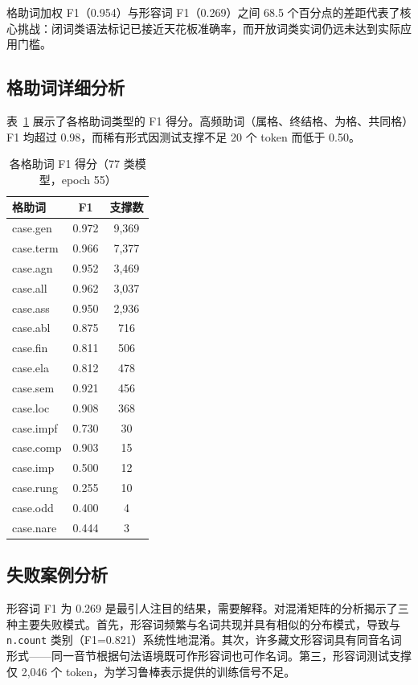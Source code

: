 \documentclass[11pt,a4paper]{article}
\begin{document}
格助词加权 F1（0.954）与形容词 F1（0.269）之间 68.5 个百分点的差距代表了核心挑战：闭词类语法标记已接近天花板准确率，而开放词类实词仍远未达到实际应用门槛。

\subsection{格助词详细分析}

表~\ref{tab:caseparticles} 展示了各格助词类型的 F1 得分。高频助词（属格、终结格、为格、共同格）F1 均超过 0.98，而稀有形式因测试支撑不足 20 个 token 而低于 0.50。

\begin{table}[h]
\centering
\caption{各格助词 F1 得分（77 类模型，epoch 55）}
\label{tab:caseparticles}
\begin{tabular}{lcc}
\toprule
格助词 & F1    & 支撑数 \\
\midrule
case.gen     & 0.972 &  9,369 \\
case.term    & 0.966 &  7,377 \\
case.agn     & 0.952 &  3,469 \\
case.all     & 0.962 &  3,037 \\
case.ass     & 0.950 &  2,936 \\
case.abl     & 0.875 &    716 \\
case.fin     & 0.811 &    506 \\
case.ela     & 0.812 &    478 \\
case.sem     & 0.921 &    456 \\
case.loc     & 0.908 &    368 \\
case.impf    & 0.730 &     30 \\
case.comp    & 0.903 &     15 \\
case.imp     & 0.500 &     12 \\
case.rung    & 0.255 &     10 \\
case.odd     & 0.400 &      4 \\
case.nare    & 0.444 &      3 \\
\bottomrule
\end{tabular}
\end{table}

\subsection{失败案例分析}

形容词 F1 为 0.269 是最引人注目的结果，需要解释。对混淆矩阵的分析揭示了三种主要失败模式。首先，形容词频繁与名词共现并具有相似的分布模式，导致与 \texttt{n.count} 类别（F1=0.821）系统性地混淆。其次，许多藏文形容词具有同音名词形式——同一音节根据句法语境既可作形容词也可作名词。第三，形容词测试支撑仅 2,046 个 token，为学习鲁棒表示提供的训练信号不足。
\end{document}
